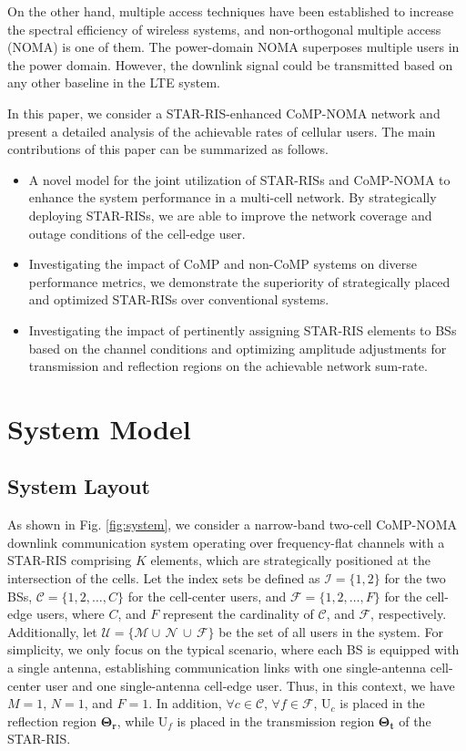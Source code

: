 \documentclass[conference]{IEEEtran}
\begin{document}
On the other hand, multiple access techniques have been established to increase the spectral efficiency of wireless systems, and non-orthogonal multiple access (NOMA) is one of them. The power-domain NOMA superposes multiple users in the power domain. However, the downlink signal could be transmitted based on any other baseline in the LTE system. 

In this paper, we consider a STAR-RIS-enhanced CoMP-NOMA network and present a detailed analysis of the achievable rates of cellular users. The main contributions of this paper can be summarized as follows.
\begin{itemize}
    \item  A novel model for the joint utilization of
    STAR-RISs and CoMP-NOMA to enhance the system performance in a multi-cell network. By strategically deploying STAR-RISs, we are able to improve the network coverage and outage conditions of the cell-edge user.
    \item Investigating the impact of CoMP and non-CoMP systems on diverse performance metrics, we demonstrate the superiority of strategically placed and optimized STAR-RISs over conventional systems.
    \item Investigating the impact of pertinently assigning STAR-RIS elements to BSs based on the channel conditions and optimizing amplitude adjustments for transmission and reflection regions on the achievable network sum-rate.

\end{itemize}

\section{System Model}
\subsection{System Layout}
As shown in Fig. \ref{fig:system}, we consider a narrow-band two-cell CoMP-NOMA downlink communication system operating over frequency-flat channels with a STAR-RIS comprising $K$ elements, which are strategically positioned at the intersection of the cells.
Let the index sets be defined as $\mathcal{I} = \{1, 2\}$ for the two BSs, $\mathcal{C} = \{1, 2,\dots, C\}$ for the cell-center users, and $\mathcal{F} = \{1, 2,\dots, F\}$ for the cell-edge users, where $C$, and $F$ represent the cardinality of $\mathcal{C}$, and $\mathcal{F}$, respectively. Additionally, let $\mathcal{U} = \{\mathcal{M}\cup\,\mathcal{N}\,\cup\,\mathcal{F}\}$ be the set of all users in the system. For simplicity, we only focus on the typical scenario, where each BS is equipped with a single antenna, establishing communication links with one single-antenna cell-center user and one single-antenna cell-edge user. Thus, in this context, we have $M=1$, $N=1$, and $F=1$. In addition, $\forall c \in \mathcal{C}$, $\forall f \in \mathcal{F}$, U$_c$ is placed in the reflection region $\mathbf{\Theta_r}$, while U$_f$ is placed in the transmission region $\mathbf{\Theta_t}$ of the STAR-RIS.
\end{document}
